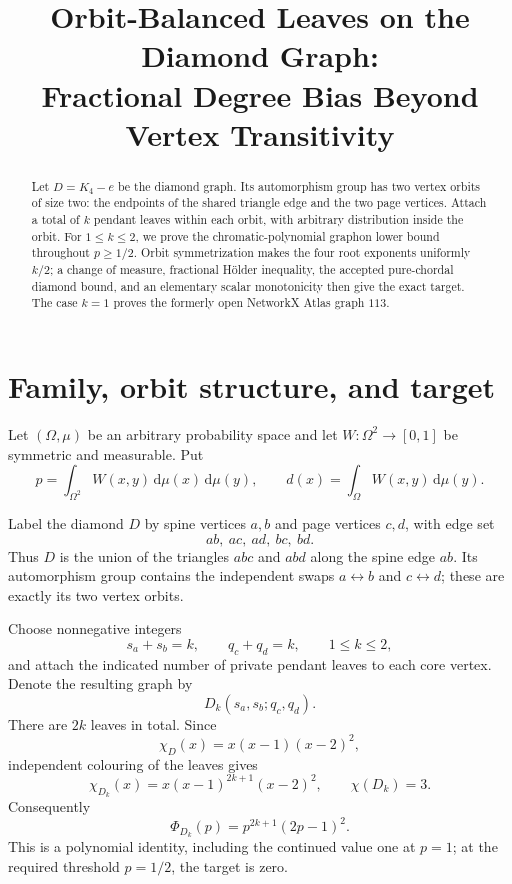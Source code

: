 \documentclass[11pt]{article}
\title{Orbit-Balanced Leaves on the Diamond Graph:\\
Fractional Degree Bias Beyond Vertex Transitivity}
\author{}
\date{}
\newcommand{\dd}{\,\mathrm d}
\begin{document}
\maketitle

\begin{abstract}
Let $D=K_4-e$ be the diamond graph.  Its automorphism group has two
vertex orbits of size two: the endpoints of the shared triangle edge and
the two page vertices.  Attach a total of $k$ pendant leaves within each
orbit, with arbitrary distribution inside the orbit.  For $1\leq k\leq2$,
we prove the chromatic-polynomial graphon lower bound throughout
$p\geq1/2$.  Orbit symmetrization makes the four root exponents uniformly
$k/2$; a change of measure, fractional H\"older inequality, the accepted
pure-chordal diamond bound, and an elementary scalar monotonicity then give
the exact target.  The case $k=1$ proves the formerly open NetworkX Atlas
graph $113$.
\end{abstract}


\section{Family, orbit structure, and target}

Let $(\Omega,\mu)$ be an arbitrary probability space and let
$W\colon\Omega^2\to[0,1]$ be symmetric and measurable.  Put
\[
 p=\int_{\Omega^2}W(x,y)\dd\mu(x)\dd\mu(y),
 \qquad
 d(x)=\int_\Omega W(x,y)\dd\mu(y).
\]

Label the diamond $D$ by spine vertices $a,b$ and page vertices $c,d$,
with edge set
\[
 ab,\ ac,\ ad,\ bc,\ bd.
\]
Thus $D$ is the union of the triangles $abc$ and $abd$ along the spine
edge $ab$.  Its automorphism group contains the independent swaps
$a\leftrightarrow b$ and $c\leftrightarrow d$; these are exactly its two
vertex orbits.

Choose nonnegative integers
\[
 s_a+s_b=k,
 \qquad
 q_c+q_d=k,
 \qquad 1\leq k\leq2,
\]
and attach the indicated number of private pendant leaves to each core
vertex.  Denote the resulting graph by
\[
 D_k(s_a,s_b;q_c,q_d).
\]
There are $2k$ leaves in total.  Since
\[
 \chi_D(x)=x(x-1)(x-2)^2,
\]
independent colouring of the leaves gives
\begin{equation}
 \chi_{D_k}(x)=x(x-1)^{2k+1}(x-2)^2,
 \qquad \chi(D_k)=3.
 \label{eq:chromatic}
\end{equation}
Consequently
\begin{equation}
 \Phi_{D_k}(p)=p^{2k+1}(2p-1)^2.
 \label{eq:target}
\end{equation}
This is a polynomial identity, including the continued value one at $p=1$;
at the required threshold $p=1/2$, the target is zero.
\end{document}
